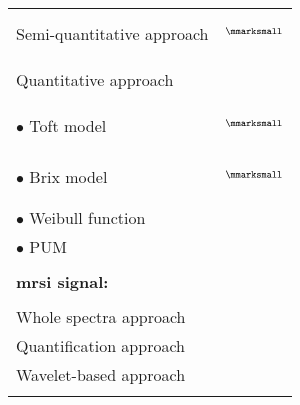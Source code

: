 \begin{longtable}{@{}l >{\raggedleft\arraybackslash}X@{}}
  \quad Semi-quantitative approach & $^{\text{{\mmarksmall}}}$\cite{Puech2009}\par \cite{Mazzetti2011,Niaf2011,Niaf2012,Sung2011,trigui2016classification,trigui2017automatic,lehaire2014computer,samarasinghe2016semi} \\ \\ [-1.5ex]
  \quad Quantitative approach &  \\ \\ [-1.5ex]
  \quad \quad $\bullet$ Toft model & $^{\text{{\mmarksmall}}}$\cite{Liu2013,Peng2013}\par \cite{Giannini2013,Langer2009,Litjens2011,Litjens2012,Litjens2014,Mazzetti2011,Niaf2011,Niaf2012,lehaire2014computer,giannini2015fully} \\
  \quad \quad $\bullet$ Brix model & $^{\text{{\mmarksmall}}}$\cite{Artan2009,Artan2010,Ozer2009,Ozer2010}\par \cite{Liu2009,Sung2011} \\
  \quad \quad $\bullet$ Weibull function & \cite{Giannini2013,Mazzetti2011,giannini2015fully} \\
  \quad \quad $\bullet$ PUM & \cite{Giannini2013,Mazzetti2011,giannini2015fully} \\ \\ [-1.5ex]
  \textbf{\acs*{mrsi} signal:} & \\ \\ [-1.5ex]
  \quad Whole spectra approach & \cite{Kelm2007,Matulewicz2013,Parfait2012,Tiwari2007,Tiwari2008,Tiwari2009,Tiwari2009a,Tiwari2010,Tiwari2013,Viswanath2008} \\
  \quad Quantification approach & \cite{Kelm2007,Parfait2012,trigui2016classification,trigui2017automatic} \\
  \quad Wavelet-based approach & \cite{Tiwari2012} \\
  \bottomrule
  \label{tab:feat}
\end{longtable}

